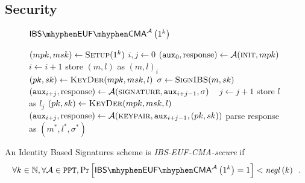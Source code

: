   \subsection{Security}
    \begin{figure}[H]
      \begin{gamebox}{$\mathsf{IBS \mhyphen EUF \mhyphen
      CMA}^{\adversary}\left(1^k\right)$}
        \begin{algorithmic}[1]
          \State $(mpk, msk) \gets \textsc{Setup}(1^k)$
          \State $i, j \gets 0$
          \State $(\mathtt{aux}_0, \mathrm{response}) \gets
          \mathcal{A}(\textsc{init}, mpk)$
              \State $i \gets i + 1$
              \State store $(m, l)$ as $(m, l)_i$
              \State $(pk, sk) \gets \textsc{KeyDer}(mpk, msk, l)$
              \State $\sigma \gets \textsc{SignIBS}(m, sk)$
              \State $(\mathtt{aux}_{i+j}, \mathrm{response}) \gets
              \mathcal{A}(\textsc{signature}, \mathtt{aux}_{i+j-1}, \sigma)$
            \Else \ 
              \State $j \gets j + 1$
              \State store $l$ as $l_j$
              \State $(pk, sk) \gets \textsc{KeyDer}(mpk, msk, l)$
              \State $(\mathtt{aux}_{i+j}, \mathrm{response}) \gets
              \mathcal{A}(\textsc{keypair}, \mathtt{aux}_{i+j-1}, (pk, sk))$
            \EndIf
          \EndWhile
          \State parse response as $(m^*, l^*, \sigma^*)$
            \State {}
          \Else
            \State {}
          \EndIf
        \end{algorithmic}
      \end{gamebox}
      \caption{}
      \label{game:ibs}
    \end{figure}
    \begin{definition}
      \label{def:ibs:secure}
      An Identity Based Signatures scheme is \emph{\textsf{IBS-EUF-CMA}-secure}
      if
      \begin{equation*}
        \forall k \in \mathbb{N}, \forall \adversary \in \mathtt{PPT},
        \Pr\left[\mathsf{IBS \mhyphen EUF \mhyphen
        CMA}^{\adversary}\left(1^k\right) = 1\right] <
        \mathit{negl}\left(k\right) \enspace.
      \end{equation*}
    \end{definition}

